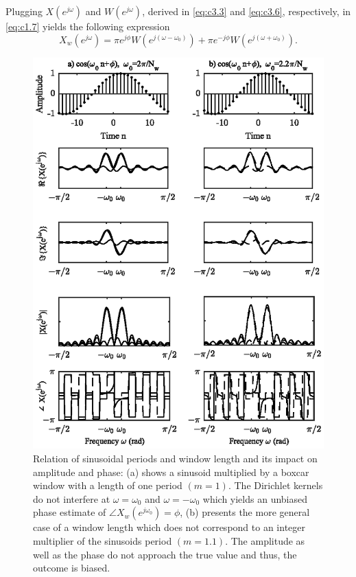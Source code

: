 \noindent Plugging $X(e^{j\omega})$ and $W(e^{j\omega})$, derived in \eqref{eq:c3.3} and \eqref{eq:c3.6}, respectively, in \eqref{eq:c1.7} yields the following expression
\begin{equation}\label{eq:c3.8}
X_w(e^{j\omega})=\pi e^{j\phi}W(e^{j(\omega-\omega_0)})+\pi e^{-j\phi}W(e^{j(\omega+\omega_0)}).
\end{equation}

\begin{figure}[ht]
	\center %
	\includegraphics{figures/figure3_2.eps}
	\vspace{-0.6cm}
	\caption{Relation of sinusoidal periods and window length and its impact on amplitude and phase: (a) shows a sinusoid multiplied by a boxcar window with a length of one period $(m=1)$. The Dirichlet kernels do not interfere at $\omega=\omega_0$ and $\omega=-\omega_0$ which yields an unbiased phase estimate of $\angle X_w(e^{j\omega_0})=\phi$, (b) presents the more general case of a window length which does not correspond to an integer multiplier of the sinusoids period $(m=1.1)$. The amplitude as well as the phase do not approach the true value and thus, the outcome is biased.}\label{Figure32}
\end{figure}

